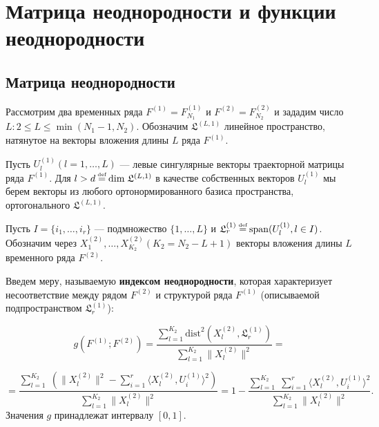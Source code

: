 \documentclass[specialist, substylefile = spbu.rtx,
			   subf, href, 12pt]{disser}
\newcommand\eqdef{\mathrel{\stackrel{\makebox[0pt]{\mbox{\normalfont\tiny def}}}{=}}}
\begin{document}
\section{Матрица неоднородности и функции неоднородности}
\subsection{Матрица неоднородности}

Рассмотрим два временных ряда $F^{(1)} = F_{N_1}^{(1)}$ и $F^{(2)} = F_{N_2}^{(2)}$ и зададим число $L: 2 \leq L \leq \min(N_1 - 1, N_2)$. Обозначим $\mathfrak{L}^{(L, 1)}$ линейное пространство, натянутое на векторы вложения длины $ L $ ряда $F^{(1)}$.

Пусть $ U_l^{(1)} (l = 1, \dotsc, L) $ --- левые сингулярные векторы траекторной матрицы ряда $ F^{(1)} $. Для $ l > d \eqdef \mathrm{dim} \; \mathfrak{L}^{(L, 1)}$ в качестве собственных векторов $ U_l^{(1)} $ мы берем векторы из любого ортонормированного базиса пространства, ортогонального $\mathfrak{L}^{(L, 1)}$.

Пусть $ I = \{i_1, \dotsc, i_r\} $ --- подмножество $ \{1, \dotsc, L\} $ и $ \mathfrak{L}_r^{(1)} \eqdef \mathrm{span}(U_l^{(1)}, l \in I) $. Обозначим через $ X_1^{(2)}, \dotsc, X_{K_2}^{(2)} (K_2 = N_2 - L + 1) $ векторы вложения длины $ L $ временного ряда $F^{(2)}$.

Введем меру, называемую \textbf{индексом неоднородности}, которая характеризует несоответствие между рядом $F^{(2)}$ и структурой ряда $F^{(1)}$ (описываемой подпространством $ \mathfrak{L}_r^{(1)} $):

$$ g(F^{(1)}; F^{(2)}) = \frac{\sum\limits_{l=1}^{K_2}\mathrm{dist}^2(X_l^{(2)}, \mathfrak{L}_r^{(1)})}{\sum\limits_{l=1}^{K_2}\|X_l^{(2)}\|^2} = $$

\begin{equation}\label{eq:g}
	 =\frac{\sum\limits_{l=1}^{K_2}\;(\|X_l^{(2)}\|^2 - \sum\limits_{i=1}^{r}\langle X_l^{(2)}, U_i^{(1)}\rangle^2)}{\sum\limits_{l=1}^{K_2}\|X_l^{(2)}\|^2} = 1 - \frac{\sum\limits_{l=1}^{K_2}\;\sum\limits_{i=1}^{r}\langle X_l^{(2)}, U_i^{(1)}\rangle^2}{\sum\limits_{l=1}^{K_2}\|X_l^{(2)}\|^2} .
\end{equation}
Значения $g$ принадлежат интервалу $[0, 1]$.
\end{document}

